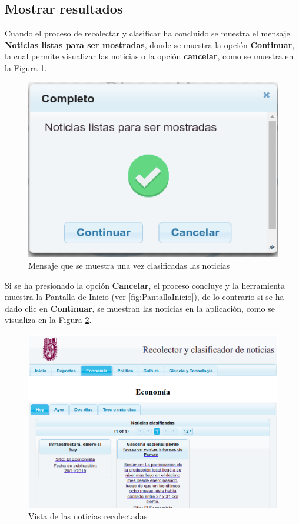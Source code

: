 \subsection{Mostrar resultados}

Cuando el proceso de recolectar y clasificar ha concluido se muestra el mensaje \textbf{Noticias listas para ser mostradas}, donde se muestra la opción \textbf{Continuar}, la cual permite visualizar las noticias o la opción \textbf{cancelar}, como se muestra en la Figura \ref{fig:notClass}.

\begin{figure}[H]
\centering
\includegraphics[scale=0.35]{imagenes/noticiasListasParaSerMostradas.png}
\caption{Mensaje que se muestra una vez clasificadas las noticias}
\label{fig:notClass}
\end{figure}

Si se ha presionado la opción \textbf{Cancelar}, el proceso concluye y la herramienta muestra la Pantalla de Inicio (ver \ref{fig:PantallaInicio}), de lo contrario si se ha dado clic en \textbf{Continuar}, se muestran las noticias en la aplicación, como se visualiza en la Figura \ref{fig:vistaNoticias}.


\begin{figure}[H]
\centering
\includegraphics[scale=0.45]{imagenes/noticiasDeHoy.png}
\caption{Vista de las noticias recolectadas}
\label{fig:vistaNoticias}
\end{figure}




